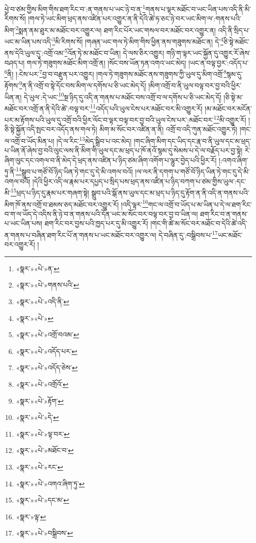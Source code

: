 ཕྱེ་བ་ཙམ་གྱིས་མིག་གིས་ཐག་རིང་བ་:ན་གནས་པ་ཡང་ཉེ་བ་ན་\footnote{«སྣར་»«པེ་»ན་}གནས་པ་ལྟར་མཐོང་བ་ཡང་ཡིན་པས་འདི་ནི་མི་རིགས་སོ། །གལ་ཏེ་ཡང་མིག་ཕྲད་ནས་འཛིན་པར་འགྱུར་ན་ནི་དེའི་ཚེ་ཧ་ཅང་ཉེ་བར་ཡང་མིག་ལ་:གནས་པའི་མིག་\footnote{«སྣར་»«པེ་»གནས་པའི་}སྨན་ནམ་ཐུར་མ་མཐོང་བར་འགྱུར་ལ། ཐག་རིང་པོར་ཡང་གསལ་བར་མཐོང་བར་འགྱུར་ན། འདི་ནི་སྲིད་པ་ཡང་མ་ཡིན་པས་འདི་\footnote{«སྣར་»«པེ་»འདི་ནི་}མི་རིགས་སོ། །གཞན་ཡང་གལ་ཏེ་མིག་གིས་ཕྱིན་ནས་གཟུགས་མཐོང་ན། དེ་\footnote{«སྣར་»«པེ་»}ཅི་སྟེ་མཐོང་ནས་དེའི་ཡུལ་དུ་:འགྲོ་འམ་\footnote{«སྣར་»«པེ་»འགྲོ་བའམ་}འོན་ཏེ་མ་མཐོང་བ་ཡིན། དེ་ལས་ཅིར་འགྱུར། གཉི་ག་ལྟར་ཡང་སྐྱོན་དུ་འགྱུར་རོ་ཞེས་བཤད་པ། གལ་ཏེ་གཟུགས་མཐོང་མིག་འགྲོ་ན། །སོང་བས་ཡོན་ཏན་འགའ་ཡང་མེད། །ཡང་ན་བལྟ་བྱར་:འདོད་པ་\footnote{«སྣར་»«པེ་»འདོད་པར་}ནི། །:ངེས་པར་\footnote{«སྣར་»«པེ་»འདོད་ཅེས་}བྱ་བ་བརྫུན་པར་འགྱུར། །གལ་ཏེ་གཟུགས་མཐོང་ནས་གཟུགས་ཀྱི་ཡུལ་དུ་མིག་འགྲོ་\footnote{«སྣར་»«པེ་»འགྲོའོ་}སྙམ་དུ་རྟོགས་\footnote{«སྣར་»«པེ་»རྟོག་}ན་ནི་འགྲོ་བ་སྟེ་དོང་བས་མིག་ལ་དགོས་པ་ཅི་ཡང་མེད་དོ། །མིག་འགྲོ་བ་ནི་ཡུལ་བལྟ་བར་བྱ་བའི་ཕྱིར་ཡིན་ན། དེ་ཡུལ་:དེ་ཡང་\footnote{«སྣར་»«པེ་»དེ་}སྔ་ཉིད་དུ་འདི་ན་གནས་པ་མཐོང་བས་འགྲོ་བ་ལ་དགོས་པ་ཅི་ཡང་མེད་དོ། །ཅི་སྟེ་མ་མཐོང་བར་འགྲོ་ན་ནི་དེའི་ཚེ་:བལྟ་བར་\footnote{«སྣར་»«པེ་»ལྟ་བར་}འདོད་པའི་ཡུལ་ངེས་པར་མཐོང་བར་མི་འགྱུར་རོ། །མ་མཐོང་བར་མངོན་པར་མ་རྟོགས་པའི་ཡུལ་དུ་འགྲོ་བའི་ཕྱིར་ལོང་བ་ལྟར་བལྟ་བར་བྱ་བའི་ཡུལ་ངེས་པར་:མཐོང་བར་\footnote{«སྣར་»«པེ་»མཐོང་བ་}མི་འགྱུར་རོ། །ཅི་སྟེ་སྐྱོན་འདི་སྤང་བར་འདོད་ནས་གལ་ཏེ། མིག་མ་སོང་བར་འཛིན་ན་ནི། འགྲོ་བ་འདི་ཀུན་མཐོང་འགྱུར་ཏེ། །གང་ལ་འགྲོ་བ་ཡོད་མིན་པ། །དེ་ལ་རིང་\footnote{«སྣར་»«པེ་»རང་}མེད་སྒྲིབ་པ་འང་མེད། །གང་ཞིག་མིག་དང་ཡིད་དང་རྣ་བ་ནི་ཡུལ་དང་མ་ཕྲད་པ་ཡིན་ནོ་ཞེས་བྱ་བའི་ལུང་ལས་ནི་མིག་གི་ཡུལ་དང་མ་ཕྲད་པ་ཁོ་ནའོ་སྙམ་དུ་སེམས་པ་དེ་ལ་བརྗོད་པར་བྱ་སྟེ། རེ་ཞིག་ལུང་དང་འགལ་བ་ནི་མེད་དེ་ཕྲད་ནས་འཛིན་པ་ཉིད་ཙམ་ཞིག་འགོག་པ་ལྷུར་བྱེད་པའི་ཕྱིར་རོ། །:འགའ་ཞིག་ཏུ་ནི་\footnote{«སྣར་»«པེ་»འགའ་ཞིག་ཏུ་}སྒྲུབ་པ་གཙོ་བོ་ཉིད་ཡིན་ཏེ་གང་དུ་དེ་མི་འགལ་བའོ། །ལ་ལར་ནི་དགག་པ་གཙོ་བོ་ཉིད་ཡིན་ཏེ་གང་དུ་དེ་མི་འགལ་བའོ། །དེའི་ཕྱིར་འདི་ལ་རྣམ་པར་དཔྱད་པ་སྲིད་པས་ཕྲད་ནས་འཛིན་པ་ཉིད་བཀག་པ་ཙམ་གྱིས་ཡུལ་:དང་མི་\footnote{«སྣར་»«པེ་»དང་མ་}ཕྲད་པ་ཉིད་དུ་རྣམ་པར་གཞག་སྟེ། སྒྲུབ་པའི་སྒོ་ནས་ཡུལ་དང་མ་ཕྲད་པ་ཉིད་དུ་རྟོག་ན་ནི་འདི་ན་གནས་པའི་མིག་ཁོ་ནས་འགྲོ་བ་ཐམས་ཅད་མཐོང་བར་འགྱུར་རོ། །འདི་ལྟར་\footnote{«སྣར་»ལྟ་}གང་ལ་འགྲོ་བ་ཡོད་པ་མ་ཡིན་པ་དེ་ལ་ཐག་རིང་བ་ག་ལ་ཡོད་དེ་འདིས་ནི་ཉེ་བ་ན་གནས་པའི་དོན་ཡང་མ་སོང་བར་བལྟ་བར་བྱ་བ་ཡིན་ལ། ཐག་རིང་བ་ན་གནས་པ་ཡང་ཡིན་པས། ཐག་རིང་བར་བྱས་པའི་ཁྱད་པར་དུ་མི་འགྱུར་རོ། །གང་གི་ཚེ་མ་སོང་བར་མཐོང་བ་དེའི་ཚེ་འདི་ན་གནས་པ་བཞིན་ཐག་རིང་པོ་ན་གནས་པ་ཡང་མཐོང་བར་འགྱུར་ལ། དེ་བཞིན་དུ་:བསྒྲིབས་པ་\footnote{«སྣར་»«པེ་»བསྒྲིབས་}ཡང་མཐོང་བར་འགྱུར་རོ། །
